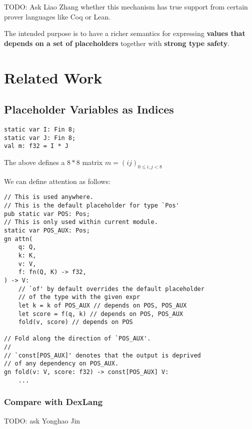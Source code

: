 \documentclass{article}
\begin{document}
TODO: Ask Liao Zhang whether this mechanism has true support from certain prover languages like Coq or Lean.

The intended purpose is to have a richer semantics for expressing \textbf{values that depends on a set of placeholders} together with \textbf{strong type safety}.

\section{Related Work}
\subsection{Placeholder Variables as Indices}

\begin{tcolorbox}[colback=gray!5,colframe=gray!50!black,title=Husky Code]
    \begin{lstlisting}[language=Husky]
static var I: Fin 8;
static var J: Fin 8;
val m: f32 = I * J
\end{lstlisting}
\end{tcolorbox}

The above defines a $8*8$ matrix $m=(ij)_{0\le i,j<8}$

We can define attention as follows:

\begin{tcolorbox}[colback=gray!5,colframe=gray!50!black,title=Husky Code]
    \begin{lstlisting}[language=Husky]
// This is used anywhere.
// This is the default placeholder for type `Pos'
pub static var POS: Pos;
// This is only used within current module.
static var POS_AUX: Pos;
gn attn(
    q: Q,
    k: K,
    v: V,
    f: fn(Q, K) -> f32,
) -> V:
    // `of' by default overrides the default placeholder
    // of the type with the given expr
    let k = k of POS_AUX // depends on POS, POS_AUX
    let score = f(q, k) // depends on POS, POS_AUX
    fold(v, score) // depends on POS

// Fold along the direction of `POS_AUX'.
//
// `const[POS_AUX]' denotes that the output is deprived
// of any dependency on POS_AUX.
gn fold(v: V, score: f32) -> const[POS_AUX] V:
    ...
\end{lstlisting}
\end{tcolorbox}

\subsubsection{Compare with DexLang}
TODO: ask Yonghao Jin
\end{document}

